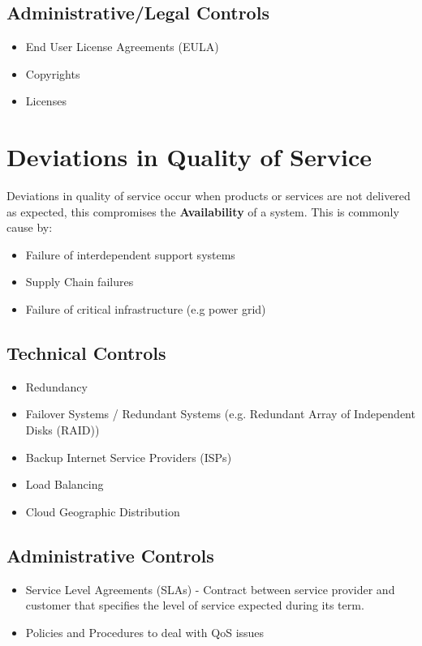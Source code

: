 \documentclass[12pt letter]{report}
\begin{document}
\subsection{Administrative/Legal Controls}

\begin{itemize}
  \item  End User License Agreements (EULA)
  \item Copyrights
  \item Licenses
\end{itemize}

\section{Deviations in Quality of Service}

Deviations in quality of service occur when products or services are
not delivered as expected, this compromises the \textbf{Availability}
of a system. This is commonly cause by:
\begin{itemize}
  \item Failure of interdependent support systems
  \item Supply Chain failures
  \item Failure of critical infrastructure (e.g power grid)
\end{itemize}

\subsection{Technical Controls}
\begin{itemize}
  \item Redundancy
  \item Failover Systems / Redundant Systems (e.g. Redundant Array of
    Independent Disks (RAID))
  \item Backup Internet Service Providers (ISPs)
  \item Load Balancing
  \item Cloud Geographic Distribution
\end{itemize}

\subsection{Administrative Controls}
\begin{itemize}
  \item Service Level Agreements (SLAs) - Contract between service
    provider and customer that specifies the level of service
    expected during its term.
  \item Policies and Procedures to deal with QoS issues
\end{itemize}
\end{document}

